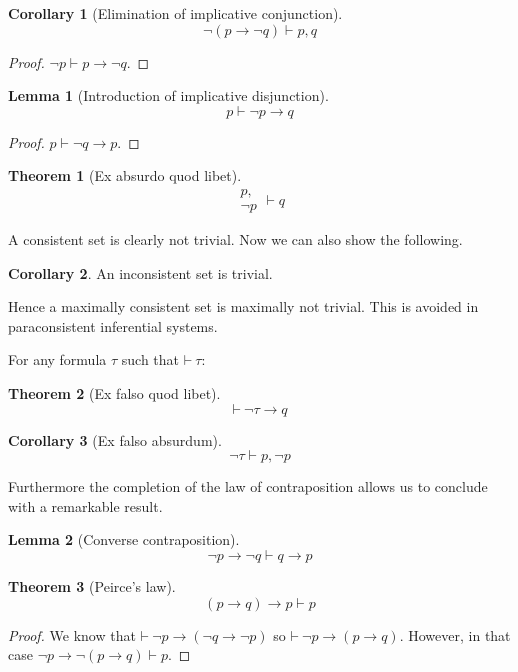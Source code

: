 \documentclass{amsbook}
\newcommand{\infers}{\mathrel\vdash}
\newcommand{\theorem}{\mathord\vdash\medspace}
\newcommand{\then}{\mathrel\rightarrow}
\theoremstyle{definition}
\newtheorem{thm}{Theorem}[section]
\newtheorem{lmm}{Lemma}[section]
\newtheorem{crl}{Corollary}[section]
\begin{document}
\begin{crl}[Elimination of implicative conjunction]
    $$\neg(p \then \neg q) \infers p, q$$
    \begin{proof}
        $\neg p \infers p \then \neg q$.
    \end{proof}
\end{crl}

\begin{lmm}[Introduction of implicative disjunction]
    $$p \infers \neg p \then q$$
    \begin{proof}
        $p \infers \neg q \then p$.
    \end{proof}
\end{lmm}

\begin{thm}[Ex absurdo quod libet]
    $$\begin{aligned}
            p, \\ \neg p
        \end{aligned}\infers q$$
\end{thm}

A consistent set is clearly not trivial. Now we can also show the following.

\begin{crl}
    An inconsistent set is trivial.
\end{crl}

Hence a maximally consistent set is maximally not trivial. This is avoided in paraconsistent inferential systems.

For any formula $\tau$ such that $\theorem \tau$:

\begin{thm}[Ex falso quod libet]
    $$\theorem \neg\tau \then q$$
\end{thm}

\begin{crl}[Ex falso absurdum]
    $$\neg\tau \infers p, \neg p$$
\end{crl}

Furthermore the completion of the law of contraposition allows us to conclude with a remarkable result.

\begin{lmm}[Converse contraposition]
    $$\neg p \then \neg q \infers q \then p$$
\end{lmm}

\begin{thm}[Peirce's law]
    $$(p \then q) \then p \infers p$$
    \begin{proof}
        We know that $\theorem \neg p \then (\neg q \then \neg p)$ so $\theorem \neg p \then (p \then q)$. However, in that case $\neg p \then \neg(p \then q) \infers p$.
    \end{proof}
\end{thm}
\end{document}
